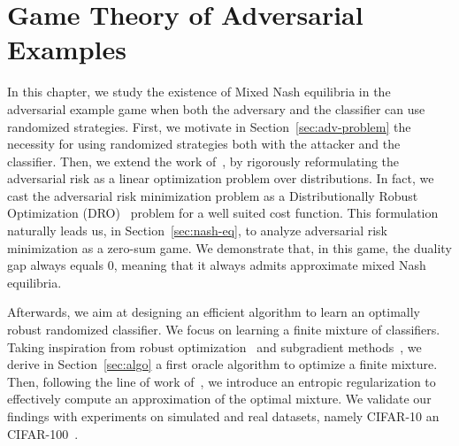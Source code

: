 \chapter{Game Theory of Adversarial Examples}
\label{chap:game}
\minitoc

In this chapter, we study the existence of Mixed Nash equilibria in the adversarial example game when both the adversary and the classifier can use randomized strategies. First, we motivate in Section~\ref{sec:adv-problem} the necessity for using randomized strategies both with the attacker and the classifier. Then, we extend the work of~\cite{pydi2019adversarial}, by rigorously reformulating the adversarial risk as a linear optimization problem over distributions. In fact, we cast the adversarial risk minimization problem as a Distributionally Robust Optimization (DRO)~\citep{blanchet2019quantifying} problem for a well suited cost function. This formulation naturally leads us, in Section~\ref{sec:nash-eq}, to analyze adversarial risk minimization as a zero-sum game. We demonstrate that, in this game, the duality gap always equals $0$, meaning that it always admits approximate mixed Nash equilibria.  

Afterwards, we aim at designing an efficient algorithm to learn an optimally robust randomized classifier.
We focus on learning a finite mixture of classifiers. Taking inspiration from robust optimization~\cite{sinha2017certifying} and subgradient methods~\cite{boyd2003subgradient}, we derive in Section~\ref{sec:algo} a first oracle algorithm to optimize a finite mixture. Then, following the line of work of~\citep{cuturi2013sinkhorn}, we introduce an entropic regularization to effectively compute an approximation of the optimal mixture. We validate our findings with experiments on simulated and real  datasets, namely CIFAR-10 an CIFAR-100~\cite{krizhevsky2009learning}.








